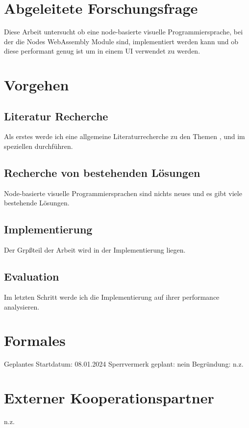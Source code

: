 \documentclass{article}
\begin{document}
\section{Abgeleitete Forschungsfrage}
Diese Arbeit untersucht ob eine node-basierte visuelle Programmiersprache, bei der die Nodes WebAssembly Module sind, implementiert werden kann und ob diese performant genug ist um in einem UI verwendet zu werden.

\section{Vorgehen}
\subsection{Literatur Recherche}
Als erstes werde ich eine allgemeine Literaturrecherche zu den Themen ,  und im speziellen  durchführen.

\subsection{Recherche von bestehenden Lösungen}

Node-basierte visuelle Programmiersprachen sind nichts neues und es gibt viele bestehende Lösungen.

\subsection{Implementierung}

Der Grpßteil der Arbeit wird in der Implementierung liegen. 

\subsection{Evaluation}

Im letzten Schritt werde ich die Implementierung auf ihrer performance analysieren.


\section{Formales}
Geplantes Startdatum: 08.01.2024
\linebreak
Sperrvermerk geplant: nein
\linebreak
Begründung: n.z.

\section{Externer Kooperationspartner}
n.z.

\printbibliography
\end{document}
